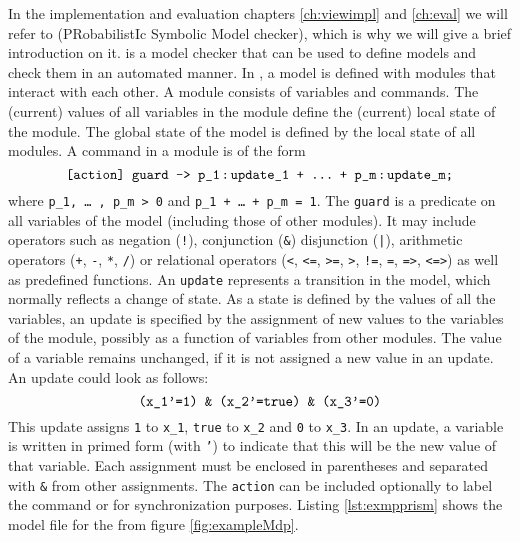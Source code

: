 \documentclass[preview]{standalone}
\begin{document}
In the implementation and evaluation chapters \ref{ch:viewimpl} and \ref{ch:eval} we will refer to \prism (PRobabilistIc Symbolic Model checker), which is why we will give a brief introduction on it. \prism is a model checker that can be used to define models and check them in an automated manner. In \prism, a model is defined with modules that interact with each other. A module consists of variables and commands. The (current) values of all variables in the module define the (current) local state of the module. The global state of the model is defined by the local state of all modules. A command in a module is of the form 
\[
\text{\texttt{[action] guard -> p\_1\!\;:\!\;update\_1\space+\space\dots\;\,+\space p\_m\!\;:\!\;update\_m;}} 
\]
where \texttt{p\_1, \dots\;\,, p\_m > 0} and \texttt{p\_1 + \dots\;\,+ p\_m = 1}.
The \texttt{guard} is a predicate on all variables of the model (including those of other modules). It may include operators such as negation (\texttt{!}), conjunction (\texttt{\&}) disjunction (\texttt{|}), arithmetic operators (\texttt{+}, \texttt{-}, \texttt{*}, \texttt{/}) or relational operators (\texttt{<}, \texttt{<=}, \texttt{>=}, \texttt{>}, \texttt{!=}, \texttt{=}, \texttt{=>}, \texttt{<=>}) as well as predefined functions.
An \texttt{update} represents a transition in the model, which normally reflects a change of state. As a state is defined by the values of all the variables, an update is specified by the assignment of new values to the variables of the module, possibly as a function of variables from other modules. The value of a variable remains unchanged, if it is not assigned a new value in an update. An update could look as follows:
\[
\text{\texttt{(x\_1'=1) \& (x\_2'=true) \& (x\_3'=0)}}
\]
This update assigns \texttt{1} to \texttt{x\_1}, \texttt{true} to \texttt{x\_2} and \texttt{0} to \texttt{x\_3}. In an update, a variable is written in primed form (with \texttt{'}) to indicate that this will be the new value of that variable. Each assignment must be enclosed in parentheses and separated with \texttt{\&} from other assignments.
The \texttt{action} can be included optionally to label the command or for synchronization purposes. Listing \ref{lst:exmpprism} shows the model file for the \mdpN \mdp from figure \ref{fig:exampleMdp}.
\end{document}
